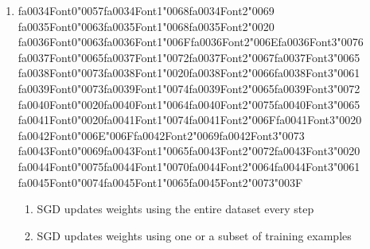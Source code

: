 \documentclass[12pt]{article}
\begin{document}
\begin{enumerate}[label=Q\arabic*.]
\begin{enumerate}[label=(\Alph*)]
    \item It improves cosine similarity
    \item It reduces dimensionality
    \item It avoids zero probabilities for unseen words
    \item It speeds up gradient descent
\end{enumerate}
\item {\csname fa0034Font0\endcsname\char"0057}{\csname fa0034Font1\endcsname\char"0068}{\csname fa0034Font2\endcsname\char"0069} {\csname fa0035Font0\endcsname\char"0063}{\csname fa0035Font1\endcsname\char"0068}{\csname fa0035Font2\endcsname\char"0020} {\csname fa0036Font0\endcsname\char"0063}{\csname fa0036Font1\endcsname\char"006F}{\csname fa0036Font2\endcsname\char"006E}{\csname fa0036Font3\endcsname\char"0076} {\csname fa0037Font0\endcsname\char"0065}{\csname fa0037Font1\endcsname\char"0072}{\csname fa0037Font2\endcsname\char"0067}{\csname fa0037Font3\endcsname\char"0065} {\csname fa0038Font0\endcsname\char"0073}{\csname fa0038Font1\endcsname\char"0020}{\csname fa0038Font2\endcsname\char"0066}{\csname fa0038Font3\endcsname\char"0061} {\csname fa0039Font0\endcsname\char"0073}{\csname fa0039Font1\endcsname\char"0074}{\csname fa0039Font2\endcsname\char"0065}{\csname fa0039Font3\endcsname\char"0072} {\csname fa0040Font0\endcsname\char"0020}{\csname fa0040Font1\endcsname\char"0064}{\csname fa0040Font2\endcsname\char"0075}{\csname fa0040Font3\endcsname\char"0065} {\csname fa0041Font0\endcsname\char"0020}{\csname fa0041Font1\endcsname\char"0074}{\csname fa0041Font2\endcsname\char"006F}{\csname fa0041Font3\endcsname\char"0020} {\csname fa0042Font0\endcsname\char"006E}{\char"006F}{\csname fa0042Font2\endcsname\char"0069}{\csname fa0042Font3\endcsname\char"0073} {\csname fa0043Font0\endcsname\char"0069}{\csname fa0043Font1\endcsname\char"0065}{\csname fa0043Font2\endcsname\char"0072}{\csname fa0043Font3\endcsname\char"0020} {\csname fa0044Font0\endcsname\char"0075}{\csname fa0044Font1\endcsname\char"0070}{\csname fa0044Font2\endcsname\char"0064}{\csname fa0044Font3\endcsname\char"0061} {\csname fa0045Font0\endcsname\char"0074}{\csname fa0045Font1\endcsname\char"0065}{\csname fa0045Font2\endcsname\char"0073}{\char"003F}
\begin{enumerate}[label=(\Alph*)]
    \item SGD updates weights using the entire dataset every step
    \item SGD updates weights using one or a subset of training examples

\end{enumerate}
\end{enumerate}
\end{document}
